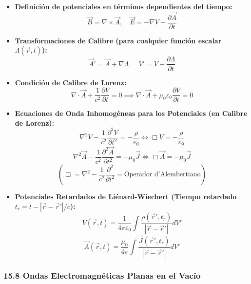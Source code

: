 \documentclass[11pt,a4paper]{article}
\begin{document}
\begin{itemize}
  \item \textbf{Definición de potenciales en términos dependientes del tiempo:}
  \[
    \vec{B} = \nabla \times \vec{A}, \quad \vec{E} = -\nabla V - \frac{\partial \vec{A}}{\partial t}
  \]
  \item \textbf{Transformaciones de Calibre (para cualquier función escalar $\Lambda(\vec{r}, t)$):}
  \[
    \vec{A}' = \vec{A} + \nabla \Lambda, \quad V' = V - \frac{\partial \Lambda}{\partial t}
  \]
  \item \textbf{Condición de Calibre de Lorenz:}
  \[
    \nabla \cdot \vec{A} + \frac{1}{c^2} \frac{\partial V}{\partial t} = 0 \implies \nabla \cdot \vec{A} + \mu_0 \varepsilon_0 \frac{\partial V}{\partial t} = 0
  \]
  \item \textbf{Ecuaciones de Onda Inhomogéneas para los Potenciales (en Calibre de Lorenz):}
  \[
    \nabla^2 V - \frac{1}{c^2} \frac{\partial^2 V}{\partial t^2} = -\frac{\rho}{\varepsilon_0} \iff \Box V = -\frac{\rho}{\varepsilon_0}
  \]
  \[
    \nabla^2 \vec{A} - \frac{1}{c^2} \frac{\partial^2 \vec{A}}{\partial t^2} = -\mu_0 \vec{J} \iff \Box \vec{A} = -\mu_0 \vec{J}
  \]
  \[
    (\Box = \nabla^2 - \frac{1}{c^2}\frac{\partial^2}{\partial t^2} = \text{Operador d'Alembertiano})
  \]
  \item \textbf{Potenciales Retardados de Liénard-Wiechert (Tiempo retardado $t_r = t - |\vec{r} - \vec{r}'|/c$):}
  \[
    V(\vec{r}, t) = \frac{1}{4\pi\varepsilon_0} \int \frac{\rho(\vec{r}', t_r)}{|\vec{r} - \vec{r}'|} dV'
  \]
  \[
    \vec{A}(\vec{r}, t) = \frac{\mu_0}{4\pi} \int \frac{\vec{J}(\vec{r}', t_r)}{|\vec{r} - \vec{r}'|} dV'
  \]
\end{itemize}

\subsubsection*{15.8 Ondas Electromagnéticas Planas en el Vacío}
\end{document}
